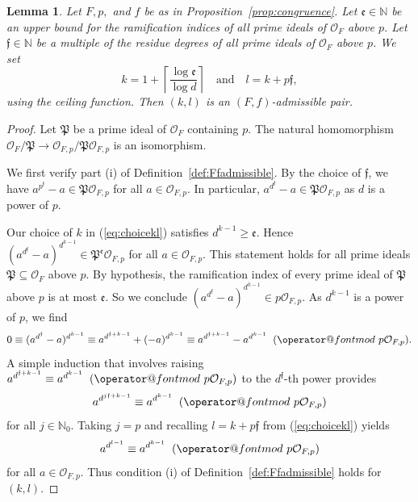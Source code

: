 \documentclass[12pt,oneside,a4]{amsart}
\makeatletter
\newcommand{\IN}{\mathbb{N}}
\newcommand{\cO}{\mathcal{O}}
\newcounter{maincounter}
\numberwithin{maincounter}{section}
\numberwithin{equation}{section}
\newtheorem{lemma}[maincounter]{Lemma}
\renewcommand{\subset}{\subseteq}
\def\imod#1{\allowbreak\mkern10mu({\operator@font mod}\,\,#1)}
\makeatother
\begin{document}
\begin{lemma}
  \label{lem:conglemma_new_cor}
  Let $F,p,$ and $f$ be as in Proposition~\ref{prop:congruence}.
  Let $\mathfrak{e}\in \IN$ be an upper bound for the ramification
  indices of all prime ideals of $\cO_F$ above $p$.
  Let $\mathfrak{f}\in\IN$ be a multiple
  of the residue degrees of all prime ideals of $\cO_F$ above $p$. We set
  \begin{equation}
    \label{eq:choicekl}
    k=1+\left\lceil\frac{\log \mathfrak{e}}{\log
        d}\right\rceil\quad\text{and}\quad
    l = k + p\mathfrak f,
  \end{equation}
  using the ceiling function.
  Then $(k,l)$ is an $(F,f)$-admissible pair.
\end{lemma}
\begin{proof}
  Let $\mathfrak{P}$ be a prime ideal of $\cO_F$ containing $p$. 
  The natural homomorphism $\cO_{F}/\mathfrak{P}\rightarrow
  \cO_{F,p}/\mathfrak{P}\cO_{F,p}$ is an isomorphism.
  
  We first verify part (i) of Definition~\ref{def:Ffadmissible}.
  By the choice of $\mathfrak f$, we
  have  $a^{p^{\mathfrak f}} - a\in \mathfrak P\cO_{F,p}$ for all
  $a\in\cO_{F,p}$. In particular, $a^{d^{\mathfrak f}}-
  a\in\mathfrak{P}\cO_{F,p}$ as $d$ is a power of $p$.

  Our choice of $k$ in (\ref{eq:choicekl}) satisfies
  $d^{k-1}\ge \mathfrak{e}$. Hence $(a^{d^{\mathfrak f}}-a)^{d^{k-1}}
  \in \mathfrak{P}^{\mathfrak{e}}\cO_{F,p}$ for all $a\in \cO_{F,p}$.
  This statement holds for all prime ideals $\mathfrak{P}\subset \cO_{F}$ above
  $p$.
  By hypothesis, the
  ramification index of every prime ideal of $\mathfrak{P}$ above
  $p$
  is at most $\mathfrak{e}$.
  So we conclude 
  $(a^{d^{\mathfrak f}}-a)^{d^{k-1}}\in {p\cO_{F,p}}$. As
  $d^{k-1}$ is a power of $p$, we find
  \begin{equation*}
    0\equiv (a^{d^{\mathfrak f}}-a)^{d^{k-1}}\equiv a^{d^{\mathfrak
        f+k-1}}+(-a)^{d^{k-1}}
    \equiv a^{d^{\mathfrak f+k-1}}-a^{d^{k-1}}\imod{p\cO_{F,p}}.
  \end{equation*}
  A simple induction that involves raising $a^{d^{\mathfrak
      f+k-1}}\equiv a^{d^{k-1}}\imod{p\cO_{F,p}}$ to the $d^{\mathfrak
    f}$-th power provides
  \begin{equation}
    \label{eq:adjpower}
    a^{d^{j\mathfrak f + k-1}} \equiv a^{d^{k-1}} \imod {p\cO_{F,p}}
  \end{equation}    
  for all $j\in\IN_0$. Taking $j=p$ and recalling
  $l = k+p\mathfrak f$ from (\ref{eq:choicekl}) yields
  \begin{equation*}
    a^{d^{l-1}} \equiv a^{d^{k-1}} \imod {p\cO_{F,p}}
  \end{equation*}
  for all $a\in\cO_{F,p}$.
  Thus condition (i) of Definition~\ref{def:Ffadmissible} holds for $(k,l)$.
    

\end{proof}
\end{document}
